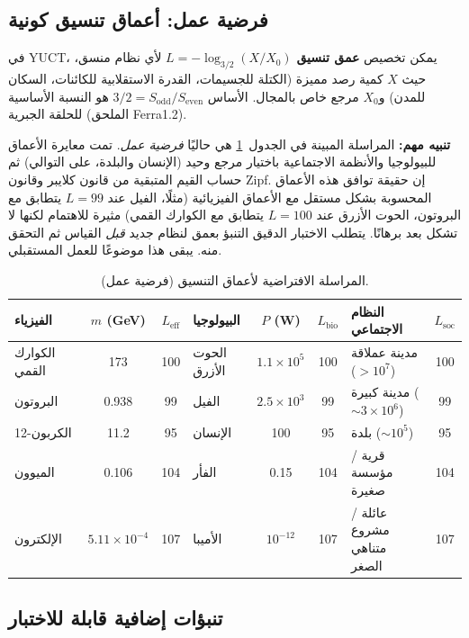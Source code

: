 \documentclass[11pt,a4paper]{article}
\theoremstyle{remark}
\begin{document}
	\subsection{فرضية عمل: أعماق تنسيق كونية}
	\label{sec:isomorphism}
	
	في YUCT، يمكن تخصيص \textbf{عمق تنسيق} \(L = -\log_{3/2}(X/X_0)\) لأي نظام منسق، حيث \(X\) كمية رصد مميزة (الكتلة للجسيمات، القدرة الاستقلابية للكائنات، السكان للمدن) و\(X_0\) مرجع خاص بالمجال. الأساس \(3/2 = S_{\mathrm{odd}}/S_{\mathrm{even}}\) هو النسبة الأساسية للحلقة الجبرية (الملحق Ferra1.2).
	
	\textbf{تنبيه مهم:} المراسلة المبينة في الجدول~\ref{tab:universal_depths} هي حاليًا \emph{فرضية عمل}. تمت معايرة الأعماق للبيولوجيا والأنظمة الاجتماعية باختيار مرجع وحيد (الإنسان والبلدة، على التوالي) ثم حساب القيم المتبقية من قانون كلايبر وقانون Zipf. إن حقيقة توافق هذه الأعماق المحسوبة بشكل مستقل مع الأعماق الفيزيائية (مثلًا، الفيل عند \(L=99\) يتطابق مع البروتون، الحوت الأزرق عند \(L=100\) يتطابق مع الكوارك القمي) مثيرة للاهتمام لكنها لا تشكل بعد برهانًا. يتطلب الاختبار الدقيق التنبؤ بعمق لنظام جديد \emph{قبل} القياس ثم التحقق منه. يبقى هذا موضوعًا للعمل المستقبلي.
	
	\begin{table}[H]
		\centering
		\caption{المراسلة الافتراضية لأعماق التنسيق (فرضية عمل).}
		\label{tab:universal_depths}
		\footnotesize
		\begin{tabular}{l c c l c c l c}
			\toprule
			\textbf{الفيزياء} & \(m\) (GeV) & \(L_{\mathrm{eff}}\) & \textbf{البيولوجيا} & \(P\) (W) & \(L_{\mathrm{bio}}\) & \textbf{النظام الاجتماعي} & \(L_{\mathrm{soc}}\) \\
			\midrule
			الكوارك القمي & 173 & 100 & الحوت الأزرق & \(1.1\times10^5\) & 100 & مدينة عملاقة ($>10^7$) & 100 \\
			البروتون & 0.938 & 99 & الفيل & \(2.5\times10^3\) & 99 & مدينة كبيرة ($\sim 3\times10^6$) & 99 \\
			الكربون-12 & 11.2 & 95 & الإنسان & 100 & 95 & بلدة ($\sim 10^5$) & 95 \\
			الميوون & 0.106 & 104 & الفأر & 0.15 & 104 & قرية / مؤسسة صغيرة & 104 \\
			الإلكترون & \(5.11\times10^{-4}\) & 107 & الأميبا & \(10^{-12}\) & 107 & عائلة / مشروع متناهي الصغر & 107 \\
			\bottomrule
		\end{tabular}
	\end{table}
	
	\subsection{تنبؤات إضافية قابلة للاختبار}
	
\end{document}
